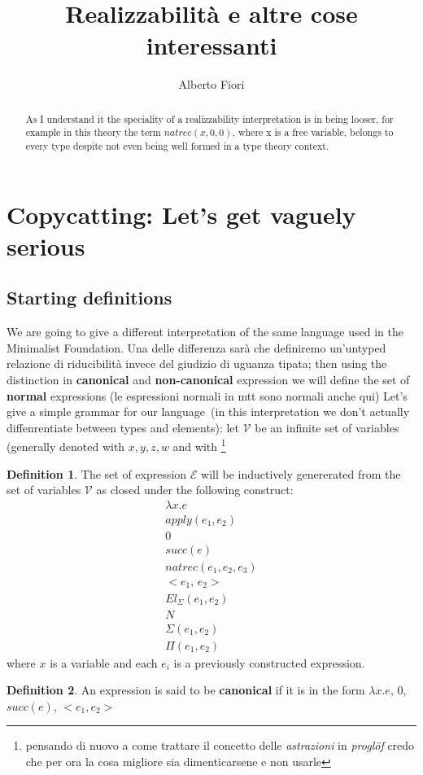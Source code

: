 \documentclass[11pt,a5paper,draft,oneside]{amsbook}
\author{Alberto Fiori}
\title{Realizzabilità e altre cose interessanti}
\theoremstyle{plain}%
\theoremstyle{definition}
\newtheorem{dede}{Definition}[section]
\theoremstyle{remark}
\newcommand{\Va}{\mathcal{V}}
\newcommand{\Ve}{\mathcal{E}}
\newcommand{\cp}[1][\cdot,\cdot]{<#1>}
\newcommand{\femph}{\textbf}
\begin{document}
\maketitle
\begin{abstract}
	As I understand it the speciality of a 
	realizzability 	interpretation is in 
	being looser, for example in this theory
	the term $natrec(x, 0, 0)$, where x is a free variable, belongs to every type despite not even being well formed in a type theory context. 
\end{abstract}

\section{Copycatting: Let's get vaguely serious}
	\subsection{Starting definitions}
		We are going to give a different interpretation 
		of the same language used in the Minimalist 
		Foundation. Una delle differenza sarà che definiremo
		un'untyped relazione di riducibilità invece 
		del giudizio di uguanza tipata; then using the distinction in \femph{canonical} and \femph{non-canonical} expression we will define the set of \femph{normal} expressions (le espressioni normali in mtt sono normali anche qui)
		Let's give a simple grammar for our language~(in this interpretation we don't actually diffenrentiate between types and elements): let $\Va$ be an infinite set of variables (generally denoted with $x,y,z,w$ and with \footnote{pensando di nuovo a come trattare il concetto delle \emph{astrazioni} in \textsl{proglöf} credo che per ora la cosa migliore sia dimenticarsene e non usarle}		
\begin{dede}
	The set of expression $\Ve$ will be inductively genererated from the set of variables $\Va$ as closed under the following construct:
	\begin{gather}
	 \lambda x.e \\
	 apply(e_1,e_2) \\
	 0 \\ 
	 succ(e) \\ 
	 natrec(e_1,e_2,e_3) \\ 
	 \cp[e_1,\,e_2] \\
	 El_\Sigma(e_1, e_2) \\
	 N 		\\
	 \Sigma(e_1,e_2)\\
	 \Pi(e_1,e_2)
	\end{gather}
	where $x$ is a variable and each $e_i$ is a previously constructed expression.
	\end{dede}
	\begin{dede}
		An expression is said to be \femph{canonical} if it is in the form $\lambda x.e$, 0, $succ(e)$, $\cp[e_1,e_2]$ 
	\end{dede}
	
\end{document}
